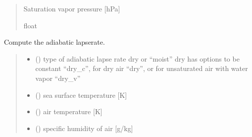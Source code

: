 \documentclass[letterpaper,10pt,english]{sphinxmanual}
\begin{document}
\begin{fulllineitems}
\begin{quote}
\begin{description}
\begin{itemize}
\end{itemize}

\sphinxAtStartPar
{} \textendash{} Saturation vapor pressure {[}hPa{]}

\sphinxAtStartPar
float

\end{description}\end{quote}

\end{fulllineitems}


\begin{fulllineitems}
\label{\detokenize{users_guide:AirSeaFluxCode.hum_subs.gamma}}
\pysigstartsignatures
\pysiglinewithargsret
{}
{\sphinxparamcomma {}\sphinxparamcomma {}\sphinxparamcomma {}\sphinxparamcomma {}}
{}
\pysigstopsignatures
\sphinxAtStartPar
Compute the adiabatic lapse\sphinxhyphen{}rate.
\begin{quote}\begin{description}
\begin{itemize}
\item {}
\sphinxAtStartPar
{} () \textendash{} type of adiabatic lapse rate dry or “moist”
dry has options to be constant “dry\_c”, for dry air “dry”, or
for unsaturated air with water vapor “dry\_v”

\item {}
\sphinxAtStartPar
{} () \textendash{} sea surface temperature {[}K{]}

\item {}
\sphinxAtStartPar
{} () \textendash{} air temperature {[}K{]}

\item {}
\sphinxAtStartPar
{} () \textendash{} specific humidity of air {[}g/kg{]}


\end{itemize}
\end{description}
\end{quote}
\end{fulllineitems}
\end{document}
